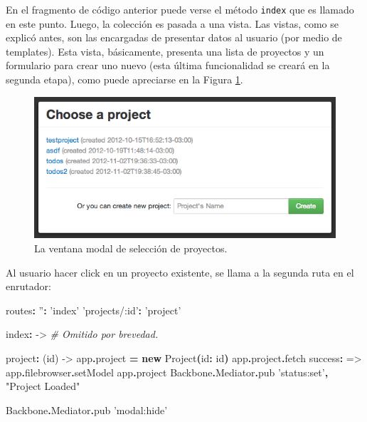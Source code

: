 \documentclass[12pt,titlepage,]{article}
\makeatletter
\newenvironment{Shaded}{}{}
\newcommand{\KeywordTok}[1]{\textcolor[rgb]{0.00,0.44,0.13}{\textbf{{#1}}}}
\newcommand{\DataTypeTok}[1]{\textcolor[rgb]{0.56,0.13,0.00}{{#1}}}
\newcommand{\StringTok}[1]{\textcolor[rgb]{0.25,0.44,0.63}{{#1}}}
\newcommand{\CommentTok}[1]{\textcolor[rgb]{0.38,0.63,0.69}{\textit{{#1}}}}
\newcommand{\FunctionTok}[1]{\textcolor[rgb]{0.02,0.16,0.49}{{#1}}}
\newcommand{\NormalTok}[1]{{#1}}
\def\maxwidth{\ifdim\Gin@nat@width>\linewidth\linewidth
\else\Gin@nat@width\fi}
\let\Oldincludegraphics\includegraphics
\renewcommand{\includegraphics}[1]{\Oldincludegraphics[width=\maxwidth]{#1}}
\makeatother
\begin{document}
En el fragmento de código anterior puede verse el método \texttt{index}
que es llamado en este punto. Luego, la colección es pasada a una vista.
Las vistas, como se explicó antes, son las encargadas de presentar datos
al usuario (por medio de templates). Esta vista, básicamente, presenta
una lista de proyectos y un formulario para crear uno nuevo (esta última
funcionalidad se creará en la segunda etapa), como puede apreciarse en
la Figura \ref{figures:projects-view}.

\begin{figure}[htbp]
\centering
\includegraphics{figures/projects-view.png}
\caption{La ventana modal de selección de proyectos.
\label{figures:projects-view}}
\end{figure}

Al usuario hacer click en un proyecto existente, se llama a la segunda
ruta en el enrutador:

\begin{Shaded}
\begin{Highlighting}[]
\NormalTok{routes}\KeywordTok{:}
  \StringTok{''}\KeywordTok{:} \StringTok{'index'}
  \StringTok{'projects/:id'}\KeywordTok{:} \StringTok{'project'}

\NormalTok{index}\KeywordTok{:} \FunctionTok{->}
  \CommentTok{# Omitido por brevedad.}

\NormalTok{project}\KeywordTok{:} \FunctionTok{(id) ->}
  \NormalTok{app}\KeywordTok{.}\NormalTok{project }\KeywordTok{=} \KeywordTok{new} \DataTypeTok{Project}\KeywordTok{(}\NormalTok{id}\KeywordTok{:} \NormalTok{id}\KeywordTok{)}
  \NormalTok{app}\KeywordTok{.}\NormalTok{project}\KeywordTok{.}\NormalTok{fetch}
    \NormalTok{success}\KeywordTok{:} \FunctionTok{=>}
      \NormalTok{app}\KeywordTok{.}\NormalTok{filebrowser}\KeywordTok{.}\NormalTok{setModel app}\KeywordTok{.}\NormalTok{project}
      \NormalTok{Backbone}\KeywordTok{.}\NormalTok{Mediator}\KeywordTok{.}\NormalTok{pub }\StringTok{'status:set'}\KeywordTok{,} \StringTok{"Project Loaded"}

  \NormalTok{Backbone}\KeywordTok{.}\NormalTok{Mediator}\KeywordTok{.}\NormalTok{pub }\StringTok{'modal:hide'}
\end{Highlighting}
\end{Shaded}
\end{document}
